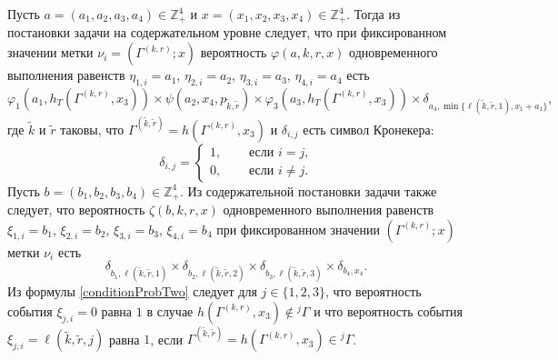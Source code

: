 \documentclass[a4paper,12pt,russian]{extarticle}
\begin{document}
Пусть $a=(a_1, a_2, a_3, a_4) \in \mathbb{Z}_+^4$ и $x=(x_1, x_2, x_3, x_4) \in \mathbb{Z}_+^4$. Тогда из постановки задачи на содержательном уровне следует, что при фиксированном значении метки $\nu_i=(\Gamma^{(k,r)}; x)$ вероятность $\varphi(a,k,r,x)$ одновременного выполнения равенств $\eta_{1,i}=a_1$, $\eta_{2,i}=a_2$, $\eta_{3,i}=a_3$, $\eta_{4,i}=a_4$ есть 
\begin{equation}
\varphi_1(a_1,h_T(\Gamma^{(k,r)},x_3)) \times \psi(a_2,x_4, p_{\tilde{k},\tilde{r}}) \times \varphi_3(a_3,h_T(\Gamma^{(k,r)},x_3))
\times \delta_{a_4,\min{\{\ell(\tilde{k},\tilde{r},1), x_1+a_1}\}},
\label{conditionProbOne}
\end{equation}
где $\tilde{k}$ и $\tilde{r}$ таковы, что $\Gamma^{(\tilde{k},\tilde{r})}=h(\Gamma^{(k,r)},x_3)$ и $\delta_{i,j}$ есть символ Кронекера:
$$
\delta_{i,j}=
\begin{cases} 
1,& \quad \text{ если $i=j$,}\\
0,& \quad \text{ если $i\neq j$.}
\end{cases}
$$%
Пусть $b=(b_1, b_2, b_3, b_4) \in \mathbb{Z}_+^4$. Из содержательной постановки задачи также следует, что вероятность $\zeta(b, k, r, x)$ одновременного выполнения равенств $\xi_{1,i}=b_1$, $\xi_{2,i}=b_2$, $\xi_{3,i}=b_3$, $\xi_{4,i}=b_4$ при фиксированном значении $(\Gamma^{(k,r)}; x)$ метки $\nu_i$ есть
\begin{equation}
\delta_{b_1,\ell(\tilde{k},\tilde{r},1)} \times \delta_{b_2,\ell(\tilde{k},\tilde{r},2)} \times 
\delta_{b_3,\ell(\tilde{k},\tilde{r},3)} \times \delta_{b_4,x_4}.
\label{conditionProbTwo}
\end{equation}
Из формулы \eqref{conditionProbTwo} следует для $j\in \{1, 2, 3\}$, что вероятность события $\xi_{j,i}=0$ равна $1$ в случае $h(\Gamma^{(k,r)},x_3)\notin {}^j\Gamma$ и что вероятность события $\xi_{j,i}=\ell(\tilde{k},\tilde{r},j)$ равна $1$, если $\Gamma^{(\tilde{k},\tilde{r})}=h(\Gamma^{(k,r)},x_3)\in {}^j\Gamma$.
\end{document}
